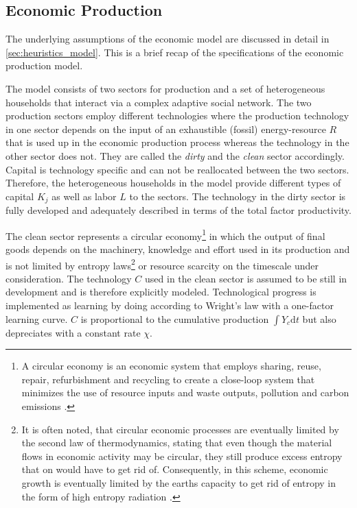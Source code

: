 \subsection{Economic Production}
\label{sec:approx_economy}

The underlying assumptions of the economic model are discussed in detail in \cref{sec:heuristics_model}. This is a brief recap of the specifications of the economic production model. 

The model consists of two sectors for production and a set of heterogeneous households that interact via a complex adaptive social network. The two production sectors employ different technologies where the production technology in one sector depends on the input of an exhaustible (fossil) energy-resource $R$ that is used up in the economic production process whereas the technology in the other sector does not. They are called the \textit{dirty} and the \textit{clean} sector accordingly. Capital is technology specific and can not be reallocated between the two sectors.
Therefore, the heterogeneous households in the model provide different types of capital $K_j$ as well as labor $L$ to the sectors.
The technology in the dirty sector is fully developed and adequately described in terms of the total factor productivity. 

The clean sector represents a circular economy\footnote{A circular economy is an economic system that employs sharing, reuse, repair, refurbishment and recycling to create a close-loop system that minimizes the use of resource inputs and waste outputs, pollution and carbon emissions \citep{Stahel2016, Geissdoerfer2017}.} in which the output of final goods depends on the machinery, knowledge and effort used in its production and is not limited by entropy laws\footnote{It is often noted, that circular economic processes are eventually limited by the second law of thermodynamics, stating that even though the material flows in economic activity may be circular, they still produce excess entropy that on would have to get rid of. Consequently, in this scheme, economic growth is eventually limited by the earths capacity to get rid of entropy in the form of high entropy radiation \citep{Georgescu-Roegen1993, Kaberger2001, Korhonen2018}.} or resource scarcity on the timescale under consideration. The technology $C$ used in the clean sector is assumed to be still in development and is therefore explicitly modeled.
Technological progress is implemented as learning by doing according to Wright's law \citep{wright1936factors, Nagy2013} with a one-factor learning curve. $C$ is proportional to the cumulative production $\int Y_c \mathrm{d}t$ but also depreciates with a constant rate $\chi$.

